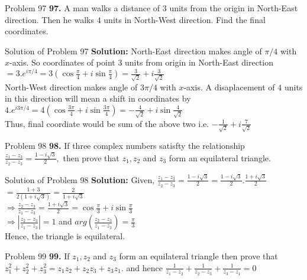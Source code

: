 \documentclass[aspectratio=169,8pt]{beamer}
\begin{document}
\begin{frame}{Problem 97}
  \textbf{97.} A man walks a distance of $3$ units from the origin in North-East direction. Then he walks $4$ units in North-West
  direction. Find the final coordinates.
\end{frame}
\begin{frame}{Solution of Problem 97}
  \textbf{Solution:} North-East direction makes angle of $\pi/4$ with $x$-axis. So coordinates of point $3$ units from origin in
  North-East direction $= 3.e^{i\pi/4} = 3\left(\cos\frac{\pi}{4} + i\sin\frac{\pi}{4}\right) = \frac{3}{\sqrt{2}} +
  i\frac{3}{\sqrt{2}}$\\
  \vspace*{0.2cm}
  North-West direction makes angle of $3\pi/4$ with $x$-axis. A disaplacement of $4$ units in this direction will mean a shift in
  coordinates by $4.e^{i3\pi/4} = 4\left(\cos\frac{3\pi}{4} + i\sin\frac{3\pi}{4}\right) = -\frac{4}{\sqrt{2}} +
  i\sin\frac{4}{\sqrt{2}}$\\
  \vspace*{0.2cm}
  Thus, final coordiate would be sum of the above two i.e. $-\frac{1}{\sqrt{2}} + i\frac{7}{\sqrt{2}}$
\end{frame}
\begin{frame}{Problem 98}
  \textbf{98.} If three complex numbers satisfty the relationship $\frac{z_1 - z_3}{z_2 - z_3} = \frac{1 - i\sqrt{3}}{2},$ then
  prove that $z_1, z_2$ and $z_3$ form an equilateral triangle.
\end{frame}
\begin{frame}{Solution of Problem 98}
  \textbf{Solution:} Given, $\frac{z_1 - z_3}{z_2 - z_3} = \frac{1 - i\sqrt{3}}{2} = \frac{1 - i\sqrt{3}}{2}.\frac{1 +
    i\sqrt{3}}{2}$\\
  \vspace*{0.2cm}
  $= \frac{1 + 3}{2(1 + i\sqrt{3})}= \frac{2}{1 + i\sqrt{3}}$\\
  \vspace*{0.2cm}
  $\Rightarrow \frac{z_2 - z_3}{z_1 - z_3} = \frac{1 + i\sqrt{3}}{2} = \cos\frac{\pi}{3} + i\sin\frac{\pi}{3}$\\
  \vspace*{0.2cm}
  $\Rightarrow \left|\frac{z_2 - z_3}{z_1 - z_3}\right| = 1$ and $arg\left(\frac{z_2 - z_3}{z_1 - z_3}\right) = \frac{\pi}{3}$\\
  \vspace*{0.2cm}
  Hence, the triangle is equilateral.
\end{frame}
\begin{frame}{Problem 99}
  \textbf{99.} If $z_1, z_2$ and $z_3$ form an equilateral triangle then prove that $z_1^2 + z_2^2 + z_3^2 = z_1z_2 + z_2z_3
  +z_3z_1.$ and hence $\frac{1}{z_1 - z_2} + \frac{1}{z_2 - z_3} + \frac{1}{z_3 - z_1} = 0$
\end{frame}
\end{document}
